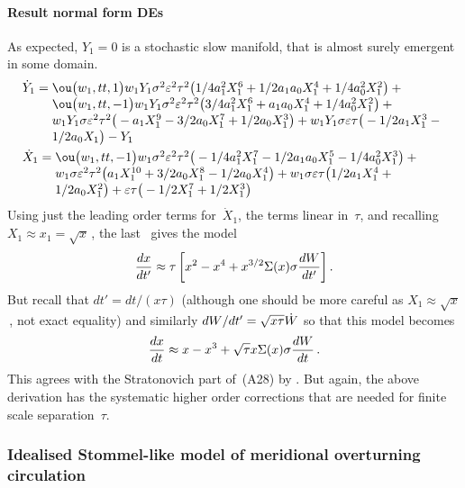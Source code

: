 \paragraph{Result normal form DEs}
As expected, \(Y_1=0\) is a stochastic slow manifold, that is almost surely emergent in some domain.
\begin{align*}&
\dot Y_{1}=\ParMath{ \ou\big(w_{1},tt,1\big) w_{1} Y_{1} \sigma ^{2} \eps^{2} 
\tau ^{2} \big(1/4 a_{1}^{2} X_{1}^{6}+1/2 a_{1} a_{0} X_{1}^{4}+1/4 a_{
0}^{2} X_{1}^{2}\big)+\ou\big(w_{1},tt,-1\big) w_{1} Y_{1} \sigma ^{2} 
\eps^{2} \tau ^{2} \big(3/4 a_{1}^{2} X_{1}^{6}+a_{1} a_{0} X_{1}^{4}+1/
4 a_{0}^{2} X_{1}^{2}\big)+w_{1} Y_{1} \sigma  \eps^{2} \tau ^{2} \big(-
a_{1} X_{1}^{9}-3/2 a_{0} X_{1}^{7}+1/2 a_{0} X_{1}^{3}\big)+w_{1} Y_{1}
 \sigma  \eps \tau  \big(-1/2 a_{1} X_{1}^{3}-1/2 a_{0} X_{1}\big)-Y_{1}
 }
\\&
\dot X_{1}=\ParMath{ \ou\big(w_{1},tt,-1\big) w_{1} \sigma ^{2} \eps^{2} \tau ^{2}
 \big(-1/4 a_{1}^{2} X_{1}^{7}-1/2 a_{1} a_{0} X_{1}^{5}-1/4 a_{0}^{2} X
_{1}^{3}\big)+w_{1} \sigma  \eps^{2} \tau ^{2} \big(a_{1} X_{1}^{10}+3/2
 a_{0} X_{1}^{8}-1/2 a_{0} X_{1}^{4}\big)+w_{1} \sigma  \eps \tau  \big(
1/2 a_{1} X_{1}^{4}+1/2 a_{0} X_{1}^{2}\big)+\eps \tau  \big(-1/2 X_{1}
^{7}+1/2 X_{1}^{3}\big)
}
\end{align*}
Using just the leading order terms for~\(\dot X_1\), the terms linear in~$\tau$, and recalling $X_1\approx x_1=\sqrt x$\,, the last \sde\ gives the model
\begin{equation*}
\de{t'}x\approx \tau\left[ x^2-x^4+x^{3/2}\Sigma(x)\sigma \de{t'} W\right].
\end{equation*}
But recall that $dt'=dt/(x\tau)$ (although one should be more careful as $X_1\approx \sqrt x$\,, not exact equality) and similarly $\de{t'}W=\sqrt{x\tau}\dot W$ so that this model becomes
\begin{equation*}
\de{t}x\approx x-x^3+\sqrt{\tau}x \Sigma(x)\sigma \de{t} W\,.
\end{equation*}
This agrees with the Stratonovich part of~(A28) by \cite{Monahan2011}.
But again, the above derivation has the systematic higher order corrections that are needed for finite scale separation~$\tau$.



\subsubsection{Idealised Stommel-like model of meridional overturning circulation}

